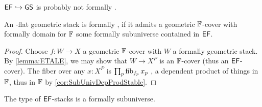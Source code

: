 \begin{warning}
	$\mathsf{EF} \hookrightarrow \mathsf{GS}$ is probably not formally \etale.
\end{warning}
\begin{lemma}{\label{lemma:FetFromFCover}}
	An \etale-flat geometric stack is formally \etale , if it admits a geometric $\mathbb{F}$-cover with formally \etale domain for $\mathbb{F}$ some formally \etale subuniverse contained in $\mathsf{EF}$.
\end{lemma}
\begin{proof}
	Choose $f: W \to X$ a geometric $\mathbb{F}$-cover with $W$ a formally \etale geometric stack. By \ref{lemma:ETALE}, we may show that $W \to X^P$ is an $\mathbb{F}$-cover (thus an $\mathsf{EF}$-cover). The fiber over any $x :X^P$ is $\prod_p \operatorname{fib}_{f_p} x_p$ , a dependent product of things in $\mathbb{F}$, thus in $\mathbb{F}$ by \ref{cor:SubUnivDepProdStable}. 
\end{proof}
\begin{theorem}
	The type of $\mathsf{EF}$-stacks is a formally \etale subuniverse.
\end{theorem}
